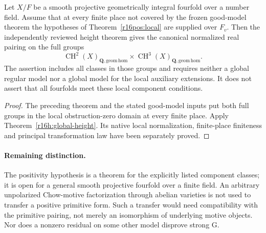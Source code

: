 \begin{corollary}
\label{r16pos:height}
Let $X/F$ be a smooth projective geometrically integral fourfold
over a number field. Assume that at every finite place not
covered by the frozen good-model theorem the hypotheses of
Theorem~\ref{r16pos:local} are supplied over $F_v$.
Then the independently reviewed height theorem gives the
canonical normalized real pairing on the full groups
\[
 \operatorname{CH}^2(X)_{\mathbf Q,\mathrm{geom\,hom}}
       \times
 \operatorname{CH}^3(X)_{\mathbf Q,\mathrm{geom\,hom}}.
\]
The assertion includes all classes in those groups and requires
neither a global regular model nor a global model for the
local auxiliary extensions. It does not assert that all
fourfolds meet these local component conditions.
\end{corollary}

\begin{proof}
The preceding theorem and the stated good-model inputs put
both full groups in the local obstruction-zero domain at
every finite place. Apply Theorem~\ref{r16h:global-height}.
Its native local normalization, finite-place finiteness and
principal transformation law have been separately proved.
\end{proof}

\paragraph{Remaining distinction.}
The positivity hypothesis is a theorem for the explicitly
listed component classes; it is open for a general smooth
projective fourfold over a finite field. An arbitrary unpolarized
Chow-motive factorization through abelian varieties is not used
to transfer a positive primitive form. Such a transfer would
need compatibility with the primitive pairing, not merely an
isomorphism of underlying motive objects. Nor does a nonzero
residual on some other model disprove strong G.
